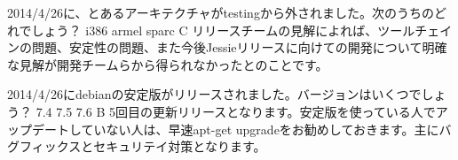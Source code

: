 %

\santaku
{2014/4/26に、とあるアーキテクチャがtestingから外されました。次のうちのどれでしょう？}
{i386}
{armel}
{sparc}
{C}
{リリースチームの見解によれば、ツールチェインの問題、安定性の問題、また今後Jessieリリースに向けての開発について明確な見解が開発チームらから得られなかったとのことです。}

\santaku
{2014/4/26にdebianの安定版がリリースされました。バージョンはいくつでしょう？}
{7.4}
{7.5}
{7.6}
{B}
{5回目の更新リリースとなります。安定版を使っている人でアップデートしていない人は、早速apt-get upgradeをお勧めしておきます。主にバグフィックスとセキュリテイ対策となります。}




